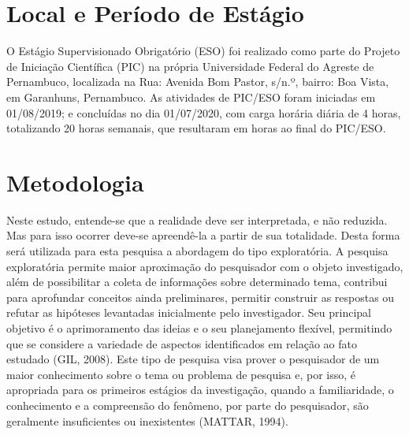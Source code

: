 \documentclass[eso]{bcc}
\begin{document}



\chapter{Local e Período de Estágio}\label{chap:local}

O Estágio Supervisionado Obrigatório (ESO) foi realizado como parte do Projeto de 
Iniciação Científica (PIC) na própria Universidade Federal do Agreste de Pernambuco,
localizada na Rua: Avenida Bom Pastor, s/n.º, bairro: Boa Vista, em Garanhuns, Pernambuco.
As atividades de PIC/ESO foram iniciadas em 01/08/2019; e concluídas no dia 01/07/2020, com
carga horária diária de 4 horas, totalizando 20 horas semanais, que resultaram em horas ao
final do PIC/ESO\@.

\chapter{Metodologia}\label{chap:metodologia}
Neste estudo, entende-se que a realidade deve ser interpretada, e não reduzida. Mas para isso 
ocorrer deve-se apreendê-la a partir de sua totalidade. Desta forma será utilizada para esta 
pesquisa a abordagem do tipo exploratória. A pesquisa exploratória permite maior aproximação 
do pesquisador com o objeto investigado, além de possibilitar a coleta de informações sobre 
determinado tema, contribui para aprofundar conceitos ainda preliminares, permitir construir 
as respostas ou refutar as hipóteses levantadas inicialmente pelo investigador. Seu principal 
objetivo é o aprimoramento das ideias e o seu planejamento flexível, permitindo que se considere 
a variedade de aspectos identificados em relação ao fato estudado (GIL, 2008). 
Este tipo de pesquisa visa prover o pesquisador de um maior conhecimento sobre o tema ou 
problema de pesquisa e, por isso, é apropriada para os primeiros estágios da investigação, 
quando a familiaridade, o conhecimento e a compreensão do fenômeno, por parte do pesquisador, 
são geralmente insuficientes ou inexistentes (MATTAR, 1994).
\end{document}
